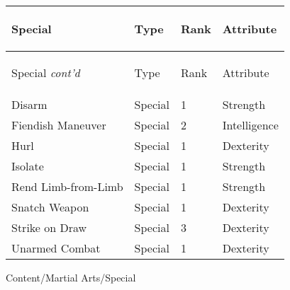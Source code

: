 \documentclass[twoside]{book}
\begin{document}
\begin{longtable}{p{1.25in}lll} 
  Special
  &
  \begin{turn}{70}{Type}\end{turn}
          
  &
  \begin{turn}{70}{Rank}\end{turn}
          
  &
  \begin{turn}{70}{Attribute}\end{turn}
          
  \\
  \hline
  \hline
  \endfirsthead
  Special \textit{cont'd}
        
  &
  \begin{turn}{70}{Type}\end{turn}
          
  &
  \begin{turn}{70}{Rank}\end{turn}
          
  &
  \begin{turn}{70}{Attribute}\end{turn}
          
  \\
  \endhead
      
  \raggedright
           Disarm 
  &
   Special 
  &
   1 
  &
   Strength 
  \tabularnewline
  \hline
      
  \raggedright
           Fiendish Maneuver 
  &
   Special 
  &
   2 
  &
   Intelligence 
  \tabularnewline
  \hline
      
  \raggedright
           Hurl 
  &
   Special 
  &
   1 
  &
   Dexterity 
  \tabularnewline
  \hline
      
  \raggedright
           Isolate 
  &
   Special 
  &
   1 
  &
   Strength 
  \tabularnewline
  \hline
      
  \raggedright
           Rend Limb-from-Limb 
  &
   Special 
  &
   1 
  &
   Strength 
  \tabularnewline
  \hline
      
  \raggedright
           Snatch Weapon 
  &
   Special 
  &
   1 
  &
   Dexterity 
  \tabularnewline
  \hline
      
  \raggedright
           Strike on Draw 
  &
   Special 
  &
   3 
  &
   Dexterity 
  \tabularnewline
  \hline
      
  \raggedright
           Unarmed Combat 
  &
   Special 
  &
   1 
  &
   Dexterity 
  \tabularnewline
  \hline
      
\end{longtable}
    Content/Martial Arts/Special
\hspace{-2ex}
\end{document}
